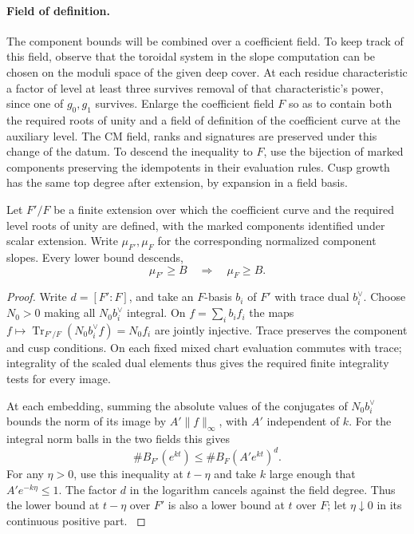 \paragraph{Field of definition.}
The component bounds will be combined over a coefficient field. To keep track of this
field, observe that the toroidal system in the slope computation can be chosen on
the moduli space of the given deep cover. At each residue
characteristic a factor of level at least three survives
removal of that characteristic's power, since one of
\(g_0,g_1\) survives. Enlarge the coefficient field \(F\)
so as to contain both the required roots of unity and a field
of definition of the coefficient curve at the auxiliary level.
The CM field, ranks and signatures are preserved under this
change of the datum. To descend the inequality to \(F\),
use the bijection of marked components preserving the
idempotents in their evaluation rules. Cusp growth has the
same top degree after extension, by expansion in a field basis.
\label{cor:covolume-component-transfer-6}

\begin{lemma}
Let \(F'/F\) be a finite extension over which the coefficient curve
and the required level roots of unity are defined, with the marked
components identified under scalar extension. Write \(\mu_{F'},\mu_F\) for the corresponding normalized component slopes. Every lower bound descends,
\[
 \mu_{F'}\ge B\quad\Longrightarrow\quad\mu_F\ge B.
\]

\end{lemma}
\begin{proof}
Write \(d=[F':F]\), and take an \(F\)-basis \(b_i\) of \(F'\)
with trace dual \(b_i^\vee\). Choose \(N_0>0\) making all
\(N_0b_i^\vee\) integral. On \(f=\sum_i b_i f_i\) the maps
\(f\mapsto\operatorname{Tr}_{F'/F}(N_0b_i^\vee f)=N_0f_i\)
are jointly injective. Trace preserves the component and cusp
conditions. On each fixed mixed chart evaluation commutes with trace;
integrality of the scaled dual elements thus gives the required
finite integrality tests for every image.

At each
embedding, summing the absolute values of the conjugates of
\(N_0b_i^\vee\) bounds the norm of its image by \(A'\|f\|_\infty\),
with \(A'\) independent of \(k\). For the integral norm balls
in the two fields this gives
\[
 \#B_{F'}(e^{kt})\le\#B_F(A'e^{kt})^d .
\]
For any \(\eta>0\), use this inequality at \(t-\eta\) and take
\(k\) large enough that \(A'e^{-k\eta}\le1\). The factor \(d\)
in the logarithm cancels against the field degree. Thus the lower
bound at \(t-\eta\) over \(F'\) is also a lower bound at \(t\)
over \(F\); let \(\eta\downarrow0\) in its continuous positive part.
\label{cor:covolume-component-transfer-7}
\end{proof}

